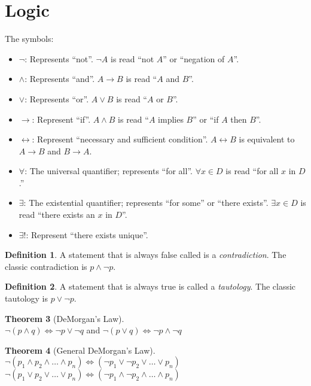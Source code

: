 \documentclass[11pt]{article}
\theoremstyle{definition}
\newtheorem{theorem}{Theorem}[section]
\newtheorem{definition}[theorem]{Definition}
\begin{document}
\section{Logic}
The symbols:
\begin{itemize}
    \item $\lnot$: Represents ``not''. $\lnot A$ is read ``not $A$'' or ``negation of $A$''.
    \item $\land$: Represents ``and''. $A \rightarrow B$ is read ``$A$ and $B$''.
    \item $\lor$: Represents ``or''. $A \lor B$ is read ``$A$ or $B$''.
    \item $\rightarrow$: Represent ``if''. $A \land B$ is read ``$A$ implies $B$'' or ``if $A$ then $B$''.
    \item $\leftrightarrow$: Represent ``necessary and sufficient
        condition''. $A \leftrightarrow B$ is equivalent to $A \rightarrow B$ and $B \rightarrow A$.
    \item $\forall$: The universal quantifier; represents ``for all''. $\forall x \in D$ is read ``for all $x$ in $D$.''
    \item $\exists$: The existential quantifier; represents ``for some'' or ``there exists''. $\exists x \in D$ is read ``there exists an $x$ in $D$''.
    \item $\exists!$: Represent ``there exists unique''. 
\end{itemize}
\begin{definition}
    A statement that is always false called is a \emph{contradiction}. The classic contradiction is $p \land \lnot p$.
\end{definition}
\begin{definition}
    A statement that is always true is called a \emph{tautology}. The classic tautology is $p \lor \lnot p$.
\end{definition}
\begin{theorem}[DeMorgan's Law]~\\
    $\lnot (p \land q) \iff \lnot p \lor \lnot q$ and
    $\lnot (p \lor q) \iff \lnot p \land \lnot q$
\end{theorem}
\begin{theorem}[General DeMorgan's Law]~\\
    $\lnot(p_1 \land p_2 \land \dots \land p_n) \iff (\lnot p_1 \lor \lnot p_2 \lor \dots \lor p_n)$ \\
    $\lnot(p_1 \lor p_2 \lor  \dots \lor  p_n) \iff (\lnot p_1 \land \lnot p_2 \land \dots \land p_n)$ \\
\end{theorem}
\end{document}
